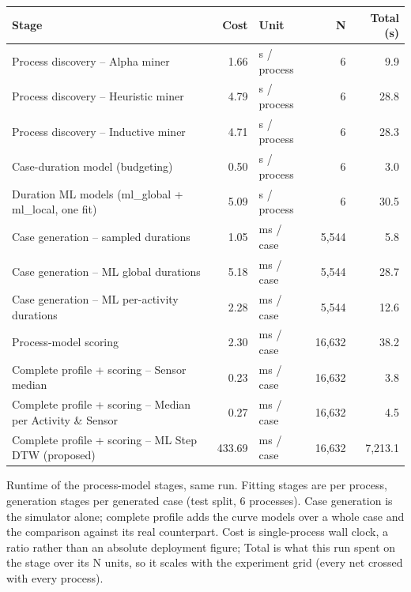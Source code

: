 \vspace{1em}

\noindent
\begin{minipage}{\textwidth}
\centering

\captionsetup{
    justification=centering,
    singlelinecheck=false,
    format=plain
}

\label{tab:timing_process_stages}

\vspace{-0.5em}

\small
\begin{tabularx}{\linewidth}{>{\raggedright\arraybackslash}X|r|l|r|r}
\toprule
Stage & Cost & Unit & N & Total (s) \\
\midrule
Process discovery -- Alpha miner & 1.66 & s / process & 6 & 9.9 \\
Process discovery -- Heuristic miner & 4.79 & s / process & 6 & 28.8 \\
Process discovery -- Inductive miner & 4.71 & s / process & 6 & 28.3 \\
Case-duration model (budgeting) & 0.50 & s / process & 6 & 3.0 \\
Duration ML models (ml\_global + ml\_local, one fit) & 5.09 & s / process & 6 & 30.5 \\
Case generation -- sampled durations & 1.05 & ms / case & 5,544 & 5.8 \\
Case generation -- ML global durations & 5.18 & ms / case & 5,544 & 28.7 \\
Case generation -- ML per-activity durations & 2.28 & ms / case & 5,544 & 12.6 \\
Process-model scoring & 2.30 & ms / case & 16,632 & 38.2 \\
Complete profile + scoring -- Sensor median & 0.23 & ms / case & 16,632 & 3.8 \\
Complete profile + scoring -- Median per Activity \& Sensor & 0.27 & ms / case & 16,632 & 4.5 \\
Complete profile + scoring -- ML Step DTW (proposed) & 433.69 & ms / case & 16,632 & 7,213.1 \\
\bottomrule
\end{tabularx}

\vspace{0.5em}

\parbox{\linewidth}{%
\footnotesize
Runtime of the process-model stages, same run. Fitting stages are per process, generation stages per generated case (test split, 6 processes). Case generation is the simulator alone; complete profile adds the curve models over a whole case and the comparison against its real counterpart. Cost is single-process wall clock, a ratio rather than an absolute deployment figure; Total is what this run spent on the stage over its N units, so it scales with the experiment grid (every net crossed with every process).
}

\end{minipage}

\vspace{1em}
